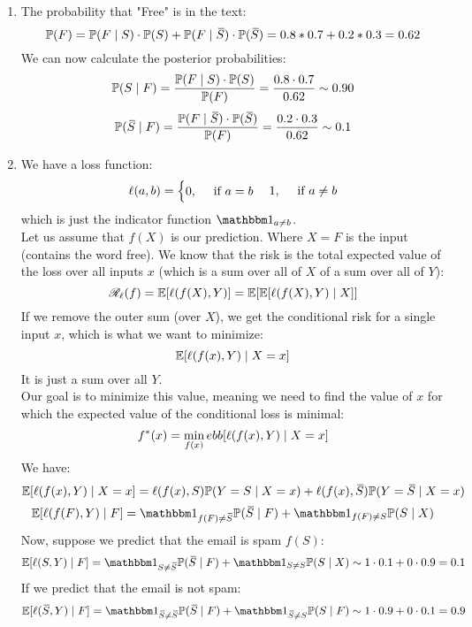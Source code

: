 \documentclass[12pt]{article}
\begin{document}
\begin{enumerate}[label=\alph*)]
    \item 
    The probability that "Free" is in the text:
    \[\mathbb{P}(F) = \mathbb{P}(F \mid S) \cdot \mathbb{P}(S)
    +  \mathbb{P}(F \mid \,\overline{\!{S}}) \cdot \mathbb{P}(\,\overline{\!{S}})
    = 0.8 * 0.7 + 0.2 * 0.3 = 0.62 \]
    We can now calculate the posterior
    probabilities:
    \[ \mathbb{P}(S \mid F)
    = \dfrac{\mathbb{P}(F \mid S) \cdot \mathbb{P}(S)}{\mathbb{P}(F)}
    = \dfrac{0.8 \cdot 0.7}{0.62}
    \sim 0.90 \]
    \[ \mathbb{P}(\,\overline{\!{S}} \mid F)
    = \dfrac{\mathbb{P}(F \mid \,\overline{\!{S}}) \cdot \mathbb{P}(\,\overline{\!{S}})}
    {\mathbb{P}(F)}
    = \dfrac{0.2 \cdot 0.3}{0.62}
    \sim 0.1 \]
    \item 
    We have a loss function:
    \[ \ell(a, b)
    = \begin{cases} 0, \quad \text{ if $a = b$} \end{cases}
    {1, \quad \text{ if $a \neq b$}} \]
    which is just the indicator function
    $\indicator_{a \neq b}$. \\ 
    Let us assume that $f(X)$
    is our prediction.
    Where $X = F$ is the input (contains
    the word free).
    We know that the risk is the total
    expected value of the loss over
    all inputs $x$
    (which is a sum over all of $X$
    of a sum over all of $Y$):
    \[ \mathscr{R}_\ell(f) = \mathbb{E}[\ell(f(X), Y)]
    = \mathbb{E}[\mathbb{E}[\ell(f(X), Y) \mid X]] \]
    If we remove the outer sum (over $X$),
    we get the conditional risk for a 
    single input $x$, which is
    what we want to minimize:
    \[ \mathbb{E}[\ell(f(x), Y) \mid X = x] \]
    It is just a sum over all $Y$. \\
    Our goal is to minimize this value,
    meaning we need to find the value of $x$
    for which the expected value 
    of the conditional loss is minimal:
    \[ f^*(x) = \min_{f(x)} \\ebb[\ell(f(x), Y) \mid X = x]  \]
    We have:
    \[ \mathbb{E}[\ell(f(x), Y) \mid X = x]
    = \ell(f(x), S)\mathbb{P}(Y = S \mid X = x)
    + \ell(f(x), \,\overline{\!{S}})\mathbb{P}(Y = \,\overline{\!{S}} \mid X = x) \]
    \[ \ebb[\ell(f(F), Y) \mid F]
    = \indicator_{f(F) \neq \olsi{S}}
    \pbb(\olsi{S} \mid F) +
    \indicator_{f(F) \neq S}
    \pbb(S \mid X)  \]
    Now, suppose we predict that
    the email is spam $f(S)$:
    \[ \ebb[\ell(S, Y) \mid F]
    = \indicator_{S \neq \olsi{S}}
    \pbb(\olsi{S} \mid F) +
    \indicator_{S \neq S}
    \pbb(S \mid X) 
    \sim 1 \cdot 0.1 + 0 \cdot 0.9 = 0.1 \]
    If we predict that the email is not spam:
    \[ \ebb[\ell(\olsi{S}, Y) \mid F]
    = \indicator_{\olsi{S} \neq \olsi{S}}
    \pbb(\olsi{S} \mid F) +
    \indicator_{\olsi{S} \neq S}
    \pbb(S \mid F) 
    \sim 1 \cdot 0.9 + 0 \cdot 0.1 = 0.9 \]

\end{enumerate}
\end{document}
